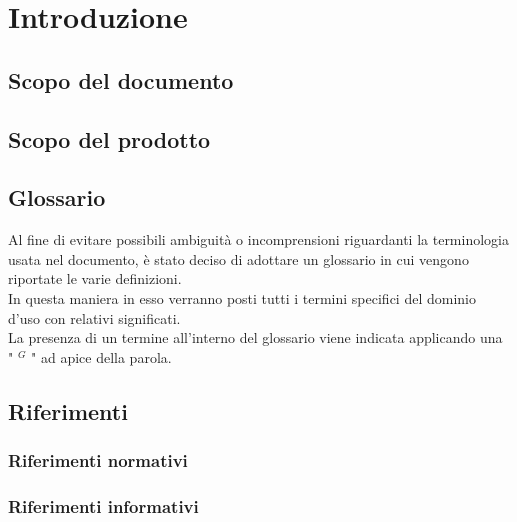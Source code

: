 
\section{Introduzione}
\subsection{Scopo del documento}

\subsection{Scopo del prodotto}
\subsection{Glossario}
Al fine di evitare possibili ambiguità o incomprensioni riguardanti la terminologia usata nel documento, è stato deciso di adottare un glossario in cui vengono riportate le varie definizioni.  \\
In questa maniera in esso verranno posti tutti i termini specifici del dominio d’uso con relativi significati. \\
La presenza di un termine all’interno del glossario viene indicata applicando una " $^{G}$ " ad apice della parola.
\subsection{Riferimenti}
\subsubsection{Riferimenti normativi}
\subsubsection{Riferimenti informativi}

